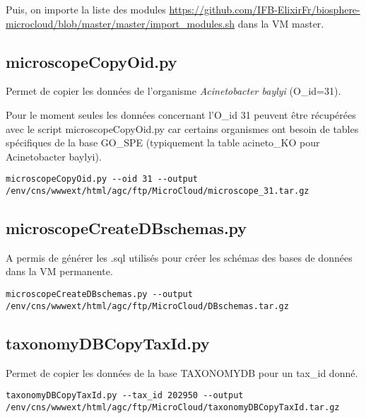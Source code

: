 Puis, on importe la liste des modules \url{https://github.com/IFB-ElixirFr/biosphere-microcloud/blob/master/master/import_modules.sh} dans la VM master.

\subsection{microscopeCopyOid.py}
Permet de copier les données de l'organisme \textit{Acinetobacter baylyi} (O\_id=31).

\begin{mycolorbox}
	Pour le moment seules les données concernant l'O\_id 31 peuvent être récupérées avec le script microscopeCopyOid.py car certains organismes ont besoin de tables spécifiques de la base GO\_SPE (typiquement la table acineto\_KO pour Acinetobacter baylyi).
\end{mycolorbox}

\begin{lstlisting}[style=bash]
microscopeCopyOid.py --oid 31 --output /env/cns/wwwext/html/agc/ftp/MicroCloud/microscope_31.tar.gz
\end{lstlisting}

\subsection{microscopeCreateDBschemas.py}
A permis de générer les .sql utilisés pour créer les schémas des bases de données dans la VM permanente.

\begin{lstlisting}[style=bash]
microscopeCreateDBschemas.py --output /env/cns/wwwext/html/agc/ftp/MicroCloud/DBschemas.tar.gz
\end{lstlisting}

\subsection{taxonomyDBCopyTaxId.py}
Permet de copier les données de la base TAXONOMYDB pour un tax\_id donné.

\begin{lstlisting}[style=bash]
taxonomyDBCopyTaxId.py --tax_id 202950 --output /env/cns/wwwext/html/agc/ftp/MicroCloud/taxonomyDBCopyTaxId.tar.gz
\end{lstlisting}